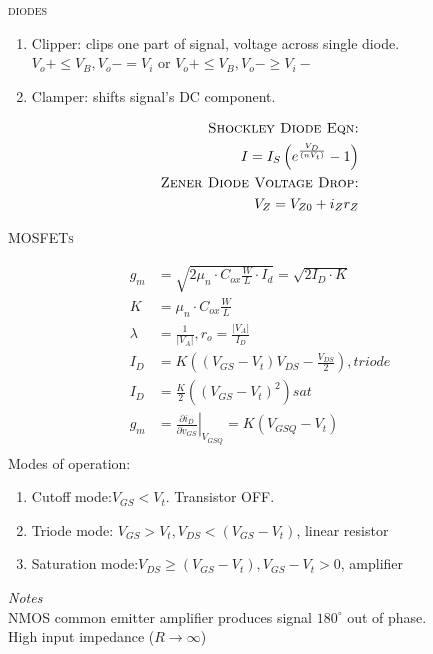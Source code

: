\documentclass[10pt,letterpaper,english]{article}
\begin{document}
\textsc{diodes}\\
\begin{multicols}{2}
\begin{enumerate}
\item{Clipper: clips one part of signal, voltage across single diode. $V_o+ \leq V_B, V_o- = V_i$ or $V_o+ \leq V_B, V_o- \geq V_i-$}
 \item{Clamper: shifts signal's DC component.}
\end{enumerate}
\begin{align*}
\textsc{Shockley Diode Eqn:}\\
I= I_S\left(e^{\frac{V_D}{\left(nV_t\right)}} - 1\right)\nonumber\\
\textsc{Zener Diode Voltage Drop:}\\
V_{Z} = V_{Z0} + i_Zr_Z\nonumber\\
\end{align*}
\end{multicols}

\textsc{MOSFETs}\\
\begin{multicols}{2}
\begin{align*}
g_m& = \sqrt{2\mu_n \cdot C_{ox}\frac{W}{L} \cdot I_d} = \sqrt{2I_D\cdot K}\\
K&= \mu_n \cdot C_{ox}\frac{W}{L} \\
\lambda&= \frac{1}{|V_A|}, r_o= \frac{|V_A|}{I_D}\\
I_D&= K\left((V_{GS} - V_t)V_{DS} -\frac{V_{DS}}{2}\right),triode\\
I_D&= \frac{K}{2}\left((V_{GS} - V_t)^{2}\right) sat\\
g_m&=\left.\frac{\partial i_D}{\partial v_{GS}} \right|_{V_{GSQ}} = K\left(V_{GSQ} - V_t\right)\nonumber\\
\end{align*}
Modes of operation:
\begin{enumerate}
\item{Cutoff mode:$V_{GS} < V_t$. Transistor OFF.}
\item{Triode mode: $V_{GS} > V_t, V_{DS} < (V_{GS} - V_t)$, linear resistor}
\item{Saturation mode:$V_{DS} \geq (V_{GS} - V_t), V_{GS} - V_t > 0$, amplifier}
\end{enumerate}
\emph{Notes}\\
NMOS common emitter amplifier produces signal $180^\circ$ out of phase.\\
High input impedance ($R\rightarrow \infty$)
\end{multicols}
\end{document}
